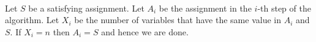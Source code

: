 \documentclass[letterpaper,12pt,oneside,onecolumn]{article}
\begin{document}
\paragraph{}
Let $S$ be a satisfying assignment. Let $A_i$ be the assignment in the $i$-th step of the algorithm. Let $X_i$ be the number of variables that have the same value in $A_i$ and $S$. If $X_i = n$ then $A_i = S$ and hence we are done.
\newpage
\section{}

\newpage
\section{}

\newpage
\section{}

\newpage
\section{}
\end{document}
